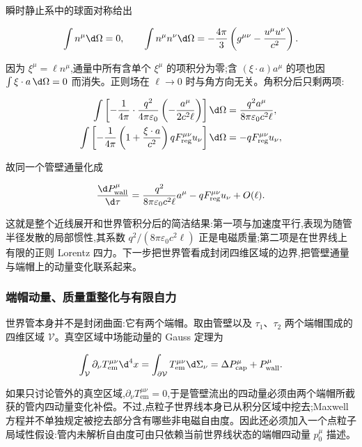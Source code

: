 瞬时静止系中的球面对称给出

\begin{equation*}
 \int n^\mu\d\Omega=0,
 \qquad
 \int n^\mu n^\nu\d\Omega
 =-{4\pi\over3}
 \left(g^{\mu\nu}-{u^\mu u^\nu\over c^2}\right).
\end{equation*}

因为 $\xi^\mu=\ell n^\mu$,通量中所有含单个 $\xi^\mu$ 的项积分为零;含 $(\xi\cdot a)a^\mu$ 的项也因 $\int\xi\cdot a\,\d\Omega=0$ 而消失。正则场在 $\ell\to0$ 时与角方向无关。角积分后只剩两项:

\begin{align*}
 \int\left[-{1\over4\pi}\cdot{q^2\over4\pi\varepsilon_0}
 \left(-{a^\mu\over2c^2\ell}\right)\right]\d\Omega
 &={q^2a^\mu\over8\pi\varepsilon_0c^2\ell},\\
 \int\left[-{1\over4\pi}
 \left(1+{\xi\cdot a\over c^2}\right)
 qF_{\mathrm{reg}}^{\mu\nu}u_\nu\right]\d\Omega
 &=-qF_{\mathrm{reg}}^{\mu\nu}u_\nu,
\end{align*}

故同一个管壁通量化成

\begin{equation*}
 {\d P_{\mathrm{wall}}^\mu\over\d\tau}
 ={q^2\over8\pi\varepsilon_0c^2\ell}a^\mu
 -qF_{\mathrm{reg}}^{\mu\nu}u_\nu
 +O(\ell).
\end{equation*}

这就是整个近线展开和世界管积分后的简洁结果:第一项与加速度平行,表现为随管半径发散的局部惯性,其系数 $q^2/(8\pi\varepsilon_0c^2\ell)$ 正是电磁质量;第二项是在世界线上有限的正则 Lorentz 四力。下一步把世界管看成封闭四维区域的边界,把管壁通量与端帽上的动量变化联系起来。

\subsubsection{端帽动量、质量重整化与有限自力}

世界管本身并不是封闭曲面:它有两个端帽。取由管壁以及 $\tau_1$、$\tau_2$ 两个端帽围成的四维区域 $\mathcal V$。真空区域中场能动量的 Gauss 定理为

\begin{equation*}
 \int_{\mathcal V}\partial_\nu T_{\mathrm{em}}^{\mu\nu}\d^4x
 =\int_{\partial\mathcal V}T_{\mathrm{em}}^{\mu\nu}\d\Sigma_\nu
 =\Delta P_{\mathrm{cap}}^\mu+P_{\mathrm{wall}}^\mu.
\end{equation*}

如果只讨论管外的真空区域,$\partial_\nu T_{\mathrm{em}}^{\mu\nu}=0$,于是管壁流出的四动量必须由两个端帽所截获的管内四动量变化补偿。不过,点粒子世界线本身已从积分区域中挖去;Maxwell 方程并不单独规定被挖去部分含有哪些非电磁自由度。因此还必须加入一个点粒子局域性假设:管内未解析自由度可由只依赖当前世界线状态的端帽四动量 $p_0^\mu$ 描述。

